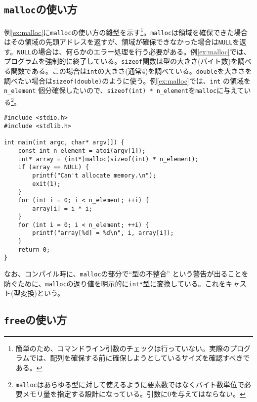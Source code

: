 \subsection{\texttt{malloc}の使い方}

例\ref{ex:malloc}に\texttt{malloc}の使い方の雛型を示す\footnote{簡単のため、コマンドライン引数のチェックは行っていない。実際のプログラムでは、配列を確保する前に確保しようとしているサイズを確認すべきである。}。\texttt{malloc}は領域を確保できた場合はその領域の先頭アドレスを返すが、領域が確保できなかった場合は\texttt{NULL}を返す。\texttt{NULL}の場合は、何らかのエラー処理を行う必要がある。例\ref{ex:malloc}では、プログラムを強制的に終了している。\texttt{sizeof}関数は型の大きさ(バイト数)を調べる関数である。この場合は\texttt{int}の大きさ(通常4)を調べている。\texttt{double}を大きさを調べたい場合は\texttt{sizeof(double)}のように使う。例\ref{ex:malloc}では、\texttt{int} の領域を \texttt{n\_element} 個分確保したいので、\texttt{sizeof(int) * n\_element}を\texttt{malloc}に与えている\footnote{\texttt{malloc}はあらゆる型に対して使えるように要素数ではなくバイト数単位で必要メモリ量を指定する設計になっている。引数に\(0\)を与えてはならない。}。
\begin{reidai}\label{ex:malloc}
    \begin{verbatim}
#include <stdio.h>
#include <stdlib.h>

int main(int argc, char* argv[]) {
    const int n_element = atoi(argv[1]);
    int* array = (int*)malloc(sizeof(int) * n_element);
    if (array == NULL) {
        printf("Can't allocate memory.\n");
        exit(1);
    }
    for (int i = 0; i < n_element; ++i) {
        array[i] = i * i;
    }
    for (int i = 0; i < n_element; ++i) {
        printf("array[%d] = %d\n", i, array[i]);
    }
    return 0;
}
\end{verbatim}
\end{reidai} \noindent
なお、コンパイル時に、\texttt{malloc}の部分で``型の不整合'' という警告が出ることを防ぐために、\texttt{malloc}の返り値を明示的に\texttt{int*}型に変換している。これをキャスト(型変換)という。

\subsection{\texttt{free}の使い方}

